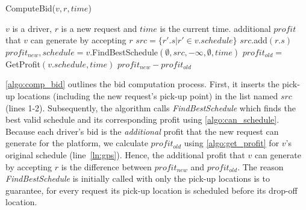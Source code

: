 \begin{algorithm}
\begin{algorithmic}[1]
%


\begin{algorithm}[!h]
	\caption{ComputeBid($v, r, time$)}
	\label{algo:comp_bid}
	\begin{algorithmic}[1]
		\REQUIRE $v$ is a driver, $r$ is a new request and $time$ is the current time.
		\ENSURE additional $profit$ that $v$ can generate by accepting $r$
		\STATE $src = \lbrace r'.s | r' \in v.schedule \rbrace$ 
		\STATE $src.$add$(r.s)$
		\STATE \small{$profit_{new}, schedule = v$.FindBestSchedule$(\emptyset, src, -\infty, \emptyset,  time)$} \label{ln:fbs}
		\STATE $profit_{old}= $GetProfit$(v.schedule, time)$ \label{ln:gps}
		\RETURN $profit_{new} - profit_{old}$
	\end{algorithmic}
\end{algorithm}\vspace{-1mm}

\cref{algo:comp_bid} outlines the bid computation process. First, it inserts the pick-up locations (including the new request's pick-up point) in the list named $src$ (lines 1-2). Subsequently, the algorithm calls \textit{FindBestSchedule} which finds the best valid schedule and its corresponding profit using \cref{algo:can_schedule}. Because each driver's bid is the \textit{additional} profit that the new request can generate for the platform, we calculate $profit_{old}$ using \cref{algo:get_profit} for $v$'s original schedule (line~\ref{ln:gps}). Hence, the additional profit that $v$ can generate by accepting $r$ is the difference between $profit_{new}$ and $profit_{old}$. The reason \textit{FindBestSchedule} is initially called with only the pick-up locations is to guarantee, for every request its pick-up location is scheduled before its drop-off location. 


\end{algorithmic}
\end{algorithm}
